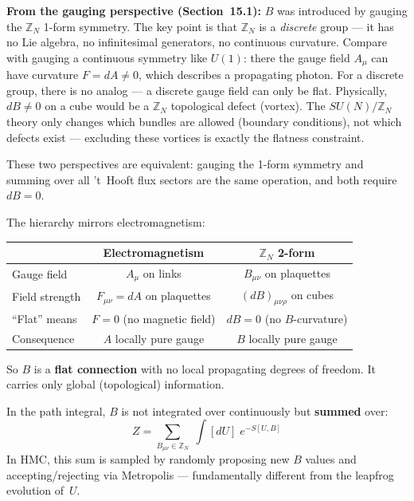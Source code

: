 \documentclass[12pt,a4paper]{article}
\begin{document}
\begin{enumerate}
    \textbf{From the gauging perspective (Section~15.1):}
    $B$ was introduced by gauging the $\mathbb{Z}_N$ 1-form symmetry.
    The key point is that $\mathbb{Z}_N$ is a \emph{discrete} group ---
    it has no Lie algebra, no infinitesimal generators, no continuous curvature.
    Compare with gauging a continuous symmetry like $U(1)$:
    there the gauge field $A_\mu$ can have curvature $F = dA \neq 0$,
    which describes a propagating photon.
    For a discrete group, there is no analog --- a discrete gauge field
    can only be flat.
    Physically, $dB \neq 0$ on a cube would be a $\mathbb{Z}_N$
    topological defect (vortex).
    The $SU(N)/\mathbb{Z}_N$ theory only changes which bundles are allowed
    (boundary conditions), not which defects exist ---
    excluding these vortices is exactly the flatness constraint.

    These two perspectives are equivalent:
    gauging the 1-form symmetry and summing over all
    't~Hooft flux sectors are the same operation,
    and both require $dB = 0$.

    The hierarchy mirrors electromagnetism:
    \begin{table}[H]
    \centering
    \begin{tabular}{|l|c|c|}
    \hline
     & Electromagnetism & $\mathbb{Z}_N$ 2-form \\
    \hline
    Gauge field & $A_\mu$ on links & $B_{\mu\nu}$ on plaquettes \\
    Field strength & $F_{\mu\nu}=dA$ on plaquettes & $(dB)_{\mu\nu\rho}$ on cubes \\
    ``Flat'' means & $F=0$ (no magnetic field) & $dB=0$ (no $B$-curvature) \\
    Consequence & $A$ locally pure gauge & $B$ locally pure gauge \\
    \hline
    \end{tabular}
    \end{table}
    So $B$ is a \textbf{flat connection} with no local propagating degrees of freedom.
    It carries only global (topological) information.
\end{enumerate}

In the path integral, $B$ is not integrated over continuously but \textbf{summed} over:
\begin{equation}
  Z = \sum_{B_{\mu\nu}\in\mathbb{Z}_N}\;\int[dU]\;e^{-S[U,B]}
\end{equation}
In HMC, this sum is sampled by randomly proposing new $B$ values
and accepting/rejecting via Metropolis --- fundamentally different from the
leapfrog evolution of~$U$.
\end{document}
